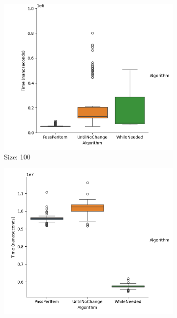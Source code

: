 \documentclass{article}
\begin{document}
\begin{figure}[ht]
  \centering
  \begin{subfigure}{0.3\textwidth}
    \centering
    \includegraphics[width=\linewidth]{../figureIntRandom100.png}
    \caption{Size: 100}
    \label{fig:img1}
  \end{subfigure}
  \begin{subfigure}{0.3\textwidth}
    \centering
    \includegraphics[width=\linewidth]{../figureIntRandom1000.png}

\end{subfigure}
\end{figure}
\end{document}
